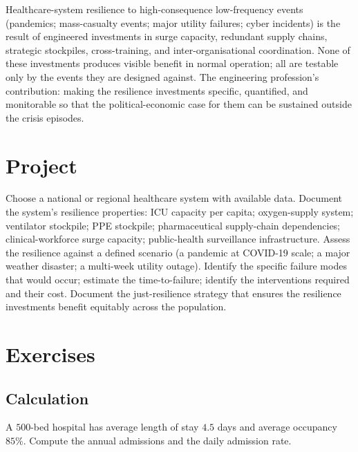 \begin{principle}
Healthcare-system resilience to high-consequence low-frequency events (pandemics; mass-casualty events; major utility failures; cyber incidents) is the result of engineered investments in surge capacity, redundant supply chains, strategic stockpiles, cross-training, and inter-organisational coordination. None of these investments produces visible benefit in normal operation; all are testable only by the events they are designed against. The engineering profession's contribution: making the resilience investments specific, quantified, and monitorable so that the political-economic case for them can be sustained outside the crisis episodes.
\end{principle}

\section{Project}

\begin{project}
Choose a national or regional healthcare system with available data. Document the system's resilience properties: ICU capacity per capita; oxygen-supply system; ventilator stockpile; PPE stockpile; pharmaceutical supply-chain dependencies; clinical-workforce surge capacity; public-health surveillance infrastructure. Assess the resilience against a defined scenario (a pandemic at COVID-19 scale; a major weather disaster; a multi-week utility outage). Identify the specific failure modes that would occur; estimate the time-to-failure; identify the interventions required and their cost. Document the just-resilience strategy that ensures the resilience investments benefit equitably across the population.
\end{project}

\section{Exercises}

\subsection*{Calculation}

\begin{exercise}
A $500$-bed hospital has average length of stay $4.5$ days and average occupancy $85\%$. Compute the annual admissions and the daily admission rate.
\end{exercise}

